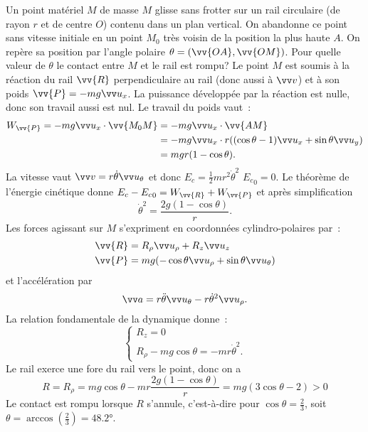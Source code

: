 Un point matériel \(M\) de masse \(M\) glisse sans frotter sur un rail 
circulaire (de rayon \(r\) et de centre \(O\)) contenu dans un plan vertical. 
On abandonne ce point sans vitesse initiale en un point \(M_0\) très voisin de 
la position la plus haute \(A\). On repère sa position par l'angle polaire 
\(\theta = (\vv{OA}, \vv{OM})\).  Pour quelle valeur de \(\theta\) le contact 
entre \(M\) et le rail est rompu? Le point \(M\) est soumis à la réaction du 
rail \(\vv{R}\) perpendiculaire au rail (donc aussi à \(\vvv\)) et à son poids 
\(\vv{P} = -mg\ux\).  La puissance développée par la réaction est nulle, donc 
son travail aussi est nul. Le travail du poids vaut~:
\begin{align}%
  W_{\vv{P}} = -mg\ux \cdot \vv{M_0M} &= -mg\ux \cdot \vv{AM} \\
  &= -mg\ux \cdot r((\cos\theta -1)\ux + \sin\theta \uy) \\
  &=mgr(1-\cos\theta).
\end{align}%
La vitesse vaut \(\vvv = r\dot{\theta} \utheta\) et donc \(E_c = 
\frac{1}{2}mr^2\dot{\theta}^2\) \({E_c}_{0}=0\). Le théorème de l'énergie 
cinétique donne \(E_c - {E_c}_{0} = W_{\vv{R}} + W_{\vv{P}}\) et après 
simplification
\begin{equation}%
  \dot{\theta}^2 = \frac{2g(1-\cos\theta)}{r}.
\end{equation}%
Les forces agissant sur \(M\) s'expriment en coordonnées cylindro-polaires 
par~:
\begin{align}%
  \vv{R} &= R_\rho \urho + R_z \uz \\
  \vv{P} &= mg(-\cos\theta \urho +\sin\theta \utheta)
\end{align}%
et l'accélération par
\begin{equation}%
  \va = r \ddot{\theta}\utheta -r\dot{\theta}^2\urho.
\end{equation}%
La relation fondamentale de la dynamique donne~:
\begin{equation}%
  \begin{cases}
    R_z = 0 \\
    R_\rho -mg\cos\theta =-mr\dot{\theta}^2.
  \end{cases}
\end{equation}%
Le rail exerce une fore du rail vers le point, donc on a
\begin{equation}%
  R=R_\rho = mg\cos\theta - mr \frac{2g(1-\cos\theta)}{r} = mg(3\cos\theta 
  -2)>0
\end{equation}%
Le contact est rompu lorsque \(R\) s'annule, c'est-à-dire pour \(\cos\theta = 
\frac{2}{3}\), soit \(\theta = \arccos\left(\frac{2}{3}\right) = \ang{48.2}\).

